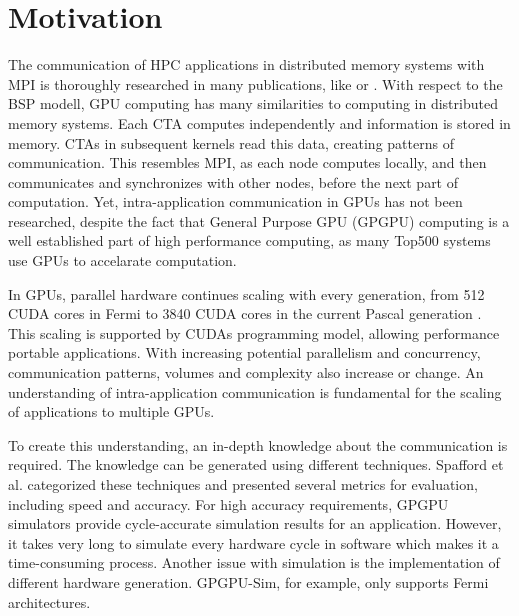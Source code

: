 \chapter{Motivation}
The communication of HPC applications in distributed memory systems with MPI is thoroughly researched in many publications, like  \cite{Klenk} or \cite{Riesen:2006:CP:1898699.1898795}.
With respect to the BSP modell, GPU computing has many similarities to computing in distributed memory systems. Each CTA computes independently and information is stored in memory. CTAs in subsequent kernels read this data, creating patterns of communication. This resembles MPI, as each node computes locally, and then communicates and synchronizes with other nodes, before the next part of computation.
Yet, intra-application communication in GPUs has not been researched, despite the fact that General Purpose GPU (GPGPU) computing is a well established part of high performance computing, as many Top500 
systems \cite{Top500} use GPUs to accelarate computation. 

In GPUs, parallel hardware continues scaling with every generation, from 512 CUDA cores in Fermi  \cite{FermiPaper} to 3840 CUDA cores in the current Pascal generation \cite{PascalPaper}. This scaling is supported by CUDAs programming model, allowing performance portable applications. With increasing potential parallelism and concurrency, communication patterns, volumes and complexity also increase or change.
An understanding of intra-application communication is fundamental for the scaling of applications to multiple
GPUs.

To create this understanding, an in-depth knowledge about the communication is required. The knowledge can be generated
using different techniques.
Spafford et al. \cite{Spafford:2012:ADS:2388996.2389110} categorized these techniques and presented several 
metrics for evaluation, including speed and accuracy. For high accuracy requirements, GPGPU simulators provide cycle-accurate simulation results for an application. However, it takes very long to simulate every hardware cycle in software which makes it a time-consuming process. 
Another issue with simulation is the implementation of different hardware generation. GPGPU-Sim, for example, only supports Fermi architectures. \cite{gpgpu}

